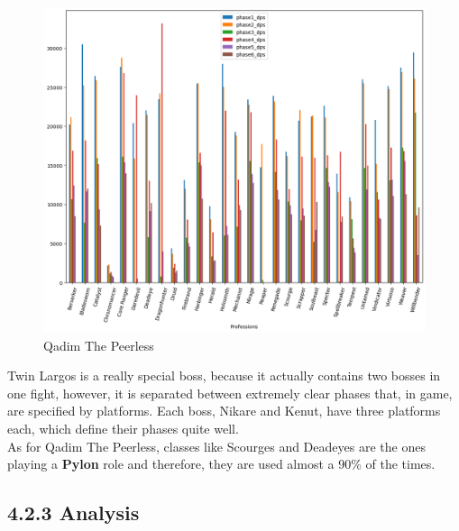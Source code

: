 \documentclass[12pt,a4paper]{article}
\begin{document}
    \begin{figure}[h!]
        
        \centering
        
        \includegraphics[width=1 \linewidth]{prlqadim_dps_plot.png}
        \caption{Qadim The Peerless}
    \end{figure}

    Twin Largos is a really special boss, because it actually contains two bosses in one fight, however, it is 
    separated between extremely clear phases that, in game, are specified by platforms. Each boss, Nikare and
    Kenut, have three platforms each, which define their phases quite well.\\

    As for Qadim The Peerless, classes like Scourges and Deadeyes are the ones playing a \textbf{Pylon} role
    and therefore, they are used almost a 90\% of the times.

    \newpage

    \subsection*{\normalsize 4.2.3 Analysis}
\end{document}

